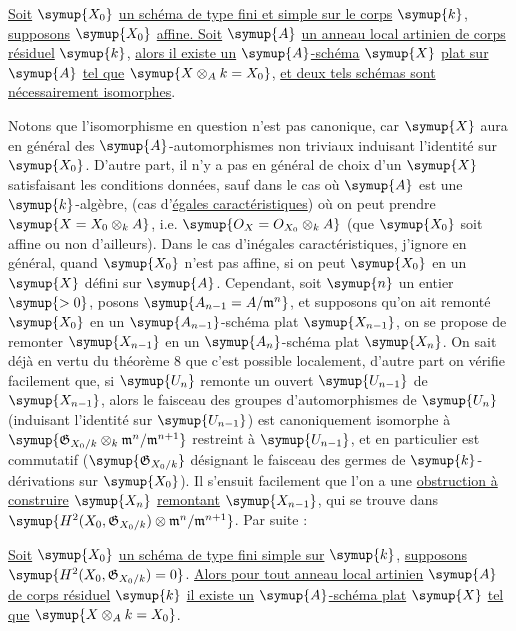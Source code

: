  \uline{Soit} $\symup{X_0}$ \uline{un schéma de type fini et simple sur le corps}
$\symup{k}$, \uline{supposons} $\symup{X_0}$ \uline{affine. Soit} $\symup{A}$ \uline{un anneau local artinien de corps
résiduel} $\symup{k}$, \uline{alors il existe un} $\symup{A}$\uline{-schéma} $\symup{X}$ \uline{plat sur} $\symup{A}$ \uline{tel que}
$\symup{X\otimes_A k=X_0}$, \uline{et deux tels schémas sont nécessairement isomorphes}.

Notons que l'isomorphisme en question n'est pas canonique, car $\symup{X}$ aura en
général des $\symup{A}$-automorphismes non triviaux induisant l'identité sur $\symup{X_0}$.
D'autre part, il n'y a pas en général de choix  d'un $\symup{X}$
satisfaisant les conditions données, sauf dans le cas où $\symup{A}$ est une
$\symup{k}$-algèbre, (cas d'\uline{égales caractéristiques}) où on peut prendre
$\symup{X=X_0\otimes_k A}$, i.e. $\symup{O_X=O_{X_0}\otimes_k A}$ (que $\symup{X_0}$ soit affine
ou non d'ailleurs). Dans le cas d'inégales caractéristiques, j'ignore en
général, quand $\symup{X_0}$ n'est pas affine, si on peut  $\symup{X_0}$ en un $\symup{X}$
défini sur $\symup{A}$. Cependant, soit $\symup{n}$ un entier $\symup{>0}$, posons
$\symup{A_{n-1}=A/\mathfrak m^n}$, et supposons qu'on ait remonté $\symup{X_0}$ en un
$\symup{A_{n-1}}$-schéma plat $\symup{X_{n-1}}$, on se propose de remonter $\symup{X_{n-1}}$ en un
$\symup{A_n}$-schéma plat $\symup{X_n}$. On sait déjà en vertu du théorème 8 que c'est possible
localement, d'autre part on vérifie facilement que, si $\symup{U_n}$ remonte un ouvert
$\symup{U_{n-1}}$ de $\symup{X_{n-1}}$, alors le faisceau des groupes d'automorphismes de $\symup{U_n}$
(induisant l'identité sur $\symup{U_{n-1}}$) est canoniquement isomorphe à
$\symup{\mathfrak G_{X_0/k}\otimes_k\mathfrak m^n/\mathfrak m^{n+1}}$
restreint à $\symup{U_{n-1}}$, et en particulier est commutatif
($\symup{\mathfrak G_{X_0/k}}$ désignant le faisceau des germes de $\symup{k}$-dérivations sur
$\symup{X_0}$). Il s'ensuit facilement que l'on a une \uline{obstruction à construire} $\symup{X_n}$
\uline{remontant} $\symup{X_{n-1}}$, qui se trouve dans
$\symup{H^2(X_0,\mathfrak G_{X_0/k})\otimes \mathfrak m^n/\mathfrak m^{n+1}}$.
Par suite :

 \uline{Soit} $\symup{X_0}$ \uline{un schéma de type fini simple sur} $\symup{k}$,
\uline{supposons}
$\symup{H^2(X_0,\mathfrak G_{X_0/k})=0}$. \uline{Alors pour tout anneau local artinien}
$\symup{A}$ \uline{de corps résiduel} $\symup{k}$ \uline{il existe un} $\symup{A}$\uline{-schéma plat} $\symup{X}$ \uline{tel que}
$\symup{X\otimes_A k=X_0}$.

